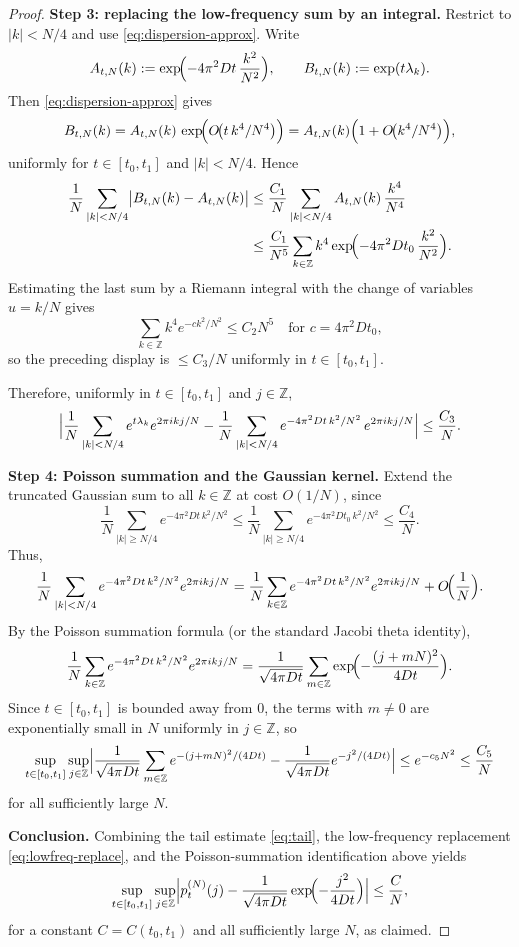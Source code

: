 \documentclass[11pt]{amsart}
\theoremstyle{definition}
\theoremstyle{remark}
\newcommand{\Z}{\mathbb{Z}}
\begin{document}
\begin{proof}
\smallskip
\noindent\textbf{Step 3: replacing the low-frequency sum by an integral.}
Restrict to $|k|<N/4$ and use \eqref{eq:dispersion-approx}. Write
\[
A_{t,N}(k):=\exp\!\Bigl(-4\pi^2 D t\,\frac{k^2}{N^2}\Bigr),
\qquad
B_{t,N}(k):=\exp(t\lambda_k).
\]
Then \eqref{eq:dispersion-approx} gives
\[
B_{t,N}(k)=A_{t,N}(k)\,\exp\!\Bigl(O\!\bigl(t\,k^4/N^4\bigr)\Bigr)
=
A_{t,N}(k)\Bigl(1+O\!\bigl(k^4/N^4\bigr)\Bigr),
\]
uniformly for $t\in[t_0,t_1]$ and $|k|<N/4$. Hence
\begin{align*}
\frac{1}{N}\sum_{|k|<N/4}\bigl|B_{t,N}(k)-A_{t,N}(k)\bigr|
&\le
\frac{C_1}{N}\sum_{|k|<N/4}A_{t,N}(k)\,\frac{k^4}{N^4}\\
&\le
\frac{C_1}{N^5}\sum_{k\in\Z}k^4\exp\!\Bigl(-4\pi^2 D t_0\,\frac{k^2}{N^2}\Bigr).
\end{align*}
Estimating the last sum by a Riemann integral with the change of variables $u=k/N$ gives
\[
\sum_{k\in\Z}k^4 e^{-c k^2/N^2}
\le
C_2 N^5
\quad\text{for }c=4\pi^2Dt_0,
\]
so the preceding display is $\le C_3/N$ uniformly in $t\in[t_0,t_1]$.

Therefore, uniformly in $t\in[t_0,t_1]$ and $j\in\Z$,
\begin{equation}\label{eq:lowfreq-replace}
\Bigl|
\frac{1}{N}\sum_{|k|<N/4}e^{t\lambda_k}e^{2\pi i k j/N}
-
\frac{1}{N}\sum_{|k|<N/4}e^{-4\pi^2 D t\,k^2/N^2}\,e^{2\pi i k j/N}
\Bigr|
\le
\frac{C_3}{N}.
\end{equation}

\smallskip
\noindent\textbf{Step 4: Poisson summation and the Gaussian kernel.}
Extend the truncated Gaussian sum to all $k\in\Z$ at cost $O(1/N)$, since
\[
\frac{1}{N}\sum_{|k|\ge N/4}e^{-4\pi^2Dt\,k^2/N^2}
\le
\frac{1}{N}\sum_{|k|\ge N/4}e^{-4\pi^2Dt_0\,k^2/N^2}
\le
\frac{C_4}{N}.
\]
Thus,
\[
\frac{1}{N}\sum_{|k|<N/4}e^{-4\pi^2 D t\,k^2/N^2}e^{2\pi i k j/N}
=
\frac{1}{N}\sum_{k\in\Z}e^{-4\pi^2 D t\,k^2/N^2}e^{2\pi i k j/N}
+O\!\Bigl(\frac{1}{N}\Bigr).
\]
By the Poisson summation formula (or the standard Jacobi theta identity),
\[
\frac{1}{N}\sum_{k\in\Z}e^{-4\pi^2 D t\,k^2/N^2}e^{2\pi i k j/N}
=
\frac{1}{\sqrt{4\pi Dt}}
\sum_{m\in\Z}\exp\!\Bigl(-\frac{(j+mN)^2}{4Dt}\Bigr).
\]
Since $t\in[t_0,t_1]$ is bounded away from $0$, the terms with $m\neq0$ are exponentially small in
$N$ uniformly in $j\in\Z$, so
\[
\sup_{t\in[t_0,t_1]}\sup_{j\in\Z}
\Bigl|
\frac{1}{\sqrt{4\pi Dt}}
\sum_{m\in\Z}e^{-(j+mN)^2/(4Dt)}
-
\frac{1}{\sqrt{4\pi Dt}}e^{-j^2/(4Dt)}
\Bigr|
\le
e^{-c_5 N^2}
\le
\frac{C_5}{N}
\]
for all sufficiently large $N$.

\smallskip
\noindent\textbf{Conclusion.}
Combining the tail estimate \eqref{eq:tail}, the low-frequency replacement
\eqref{eq:lowfreq-replace}, and the Poisson-summation identification above yields
\[
\sup_{t\in[t_0,t_1]}\sup_{j\in\Z}
\Bigl|
p_t^{(N)}(j)
-
\frac{1}{\sqrt{4\pi Dt}}\exp\!\Bigl(-\frac{j^2}{4Dt}\Bigr)
\Bigr|
\le
\frac{C}{N},
\]
for a constant $C=C(t_0,t_1)$ and all sufficiently large $N$, as claimed.
\end{proof}
\end{document}
